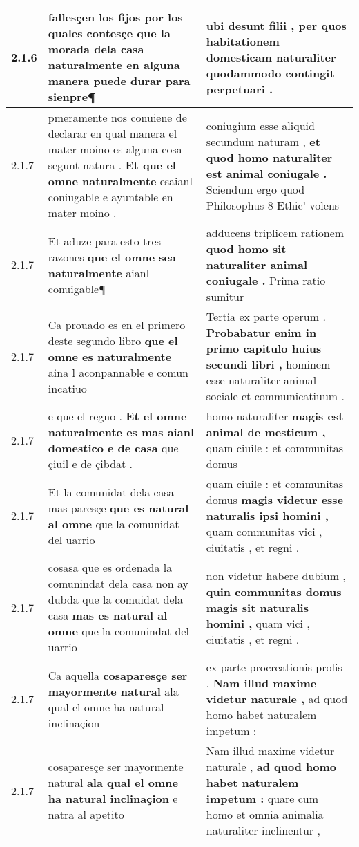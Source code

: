 \begin{tabular}{|p{1cm}|p{6.5cm}|p{6.5cm}|}
2.1.6 & fallesçen los fijos \textbf{ por los quales contesçe que la morada dela casa naturalmente } en alguna manera puede durar para sienpre¶ & ubi desunt filii , \textbf{ per quos habitationem domesticam naturaliter } quodammodo contingit perpetuari . \\\hline
2.1.7 & pmeramente nos conuiene de declarar en qual manera el mater moino es alguna cosa segunt natura . \textbf{ Et que el omne naturalmente } esaianl coniugable e ayuntable en mater moino . & coniugium esse aliquid secundum naturam , \textbf{ et quod homo naturaliter est animal coniugale . } Sciendum ergo quod Philosophus 8 Ethic’ volens \\\hline
2.1.7 & Et aduze para esto tres razones \textbf{ que el omne sea naturalmente } aianl conuigable¶ & adducens triplicem rationem \textbf{ quod homo sit naturaliter animal coniugale . } Prima ratio sumitur \\\hline
2.1.7 & Ca prouado es en el primero deste segundo libro \textbf{ que el omne es naturalmente } aina l aconpannable e comun incatiuo & Tertia ex parte operum . \textbf{ Probabatur enim in primo capitulo huius secundi libri , } hominem esse naturaliter animal sociale et communicatiuum . \\\hline
2.1.7 & e que el regno . \textbf{ Et el omne naturalmente es mas aianl domestico e de casa } que çiuil e de çibdat . & homo naturaliter \textbf{ magis est animal de mesticum , } quam ciuile : et communitas domus \\\hline
2.1.7 & Et la comunidat dela casa mas paresçe \textbf{ que es natural al omne } que la comunidat del uarrio & quam ciuile : et communitas domus \textbf{ magis videtur esse naturalis ipsi homini , } quam communitas vici , ciuitatis , et regni . \\\hline
2.1.7 & cosasa que es ordenada la comunindat dela casa non ay dubda que la comuidat dela casa \textbf{ mas es natural al omne } que la comunindat del uarrio & non videtur habere dubium , \textbf{ quin communitas domus magis sit naturalis homini , } quam vici , ciuitatis , et regni . \\\hline
2.1.7 & Ca aquella \textbf{ cosaparesçe ser mayormente natural } ala qual el omne ha natural inclinaçion & ex parte procreationis prolis . \textbf{ Nam illud maxime videtur naturale , } ad quod homo habet naturalem impetum : \\\hline
2.1.7 & cosaparesçe ser mayormente natural \textbf{ ala qual el omne ha natural inclinaçion } e natra al apetito & Nam illud maxime videtur naturale , \textbf{ ad quod homo habet naturalem impetum : } quare cum homo et omnia animalia naturaliter inclinentur , \\\hline

\end{tabular}
